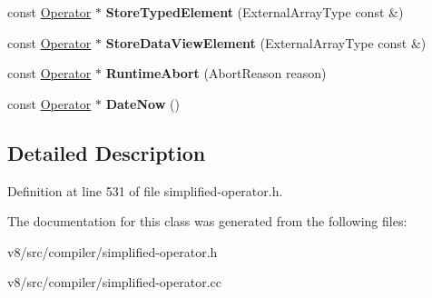 \begin{DoxyCompactItemize}
const \mbox{\hyperlink{classv8_1_1internal_1_1compiler_1_1Operator}{Operator}} $\ast$ {\bfseries Store\+Typed\+Element} (External\+Array\+Type const \&)
\item 
\mbox{\label{classv8_1_1internal_1_1compiler_1_1SimplifiedOperatorBuilder_a3b6d1a0bb193441ea9f09f55925b3642}} 
const \mbox{\hyperlink{classv8_1_1internal_1_1compiler_1_1Operator}{Operator}} $\ast$ {\bfseries Store\+Data\+View\+Element} (External\+Array\+Type const \&)
\item 
\mbox{\label{classv8_1_1internal_1_1compiler_1_1SimplifiedOperatorBuilder_a4afcc0b7516426d12c55cfa3a10541af}} 
const \mbox{\hyperlink{classv8_1_1internal_1_1compiler_1_1Operator}{Operator}} $\ast$ {\bfseries Runtime\+Abort} (Abort\+Reason reason)
\item 
\mbox{\label{classv8_1_1internal_1_1compiler_1_1SimplifiedOperatorBuilder_a28566bd74b8e281817489cd7e58b4eaa}} 
const \mbox{\hyperlink{classv8_1_1internal_1_1compiler_1_1Operator}{Operator}} $\ast$ {\bfseries Date\+Now} ()
\end{DoxyCompactItemize}


\subsection{Detailed Description}


Definition at line 531 of file simplified-\/operator.\+h.



The documentation for this class was generated from the following files\+:\begin{DoxyCompactItemize}
\item 
v8/src/compiler/simplified-\/operator.\+h\item 
v8/src/compiler/simplified-\/operator.\+cc\end{DoxyCompactItemize}
